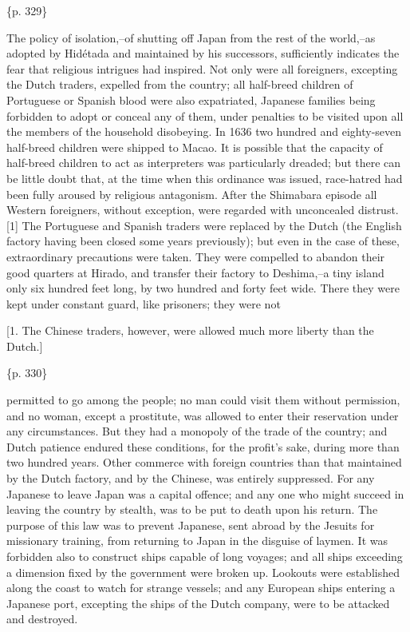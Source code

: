 \{p. 329\}

The policy of isolation,--of shutting off Japan from the rest of the world,--as adopted by Hidétada and maintained by his successors, sufficiently indicates the fear that religious intrigues had inspired. Not only were all foreigners, excepting the Dutch traders, expelled from the country; all half-breed children of Portuguese or Spanish blood were also expatriated, Japanese families being forbidden to adopt or conceal any of them, under penalties to be visited upon all the members of the household disobeying. In 1636 two hundred and eighty-seven half-breed children were shipped to Macao. It is possible that the capacity of half-breed children to act as interpreters was particularly dreaded; but there can be little doubt that, at the time when this ordinance was issued, race-hatred had been fully aroused by religious antagonism. After the Shimabara episode all Western foreigners, without exception, were regarded with unconcealed distrust.[1] The Portuguese and Spanish traders were replaced by the Dutch (the English factory having been closed some years previously); but even in the case of these, extraordinary precautions were taken. They were compelled to abandon their good quarters at Hirado, and transfer their factory to Deshima,--a tiny island only six hundred feet long, by two hundred and forty feet wide. There they were kept under constant guard, like prisoners; they were not

[1. The Chinese traders, however, were allowed much more liberty than the Dutch.]

\{p. 330\}

permitted to go among the people; no man could visit them without permission, and no woman, except a prostitute, was allowed to enter their reservation under any circumstances. But they had a monopoly of the trade of the country; and Dutch patience endured these conditions, for the profit's sake, during more than two hundred years. Other commerce with foreign countries than that maintained by the Dutch factory, and by the Chinese, was entirely suppressed. For any Japanese to leave Japan was a capital offence; and any one who might succeed in leaving the country by stealth, was to be put to death upon his return. The purpose of this law was to prevent Japanese, sent abroad by the Jesuits for missionary training, from returning to Japan in the disguise of laymen. It was forbidden also to construct ships capable of long voyages; and all ships exceeding a dimension fixed by the government were broken up. Lookouts were established along the coast to watch for strange vessels; and any European ships entering a Japanese port, excepting the ships of the Dutch company, were to be attacked and destroyed.



